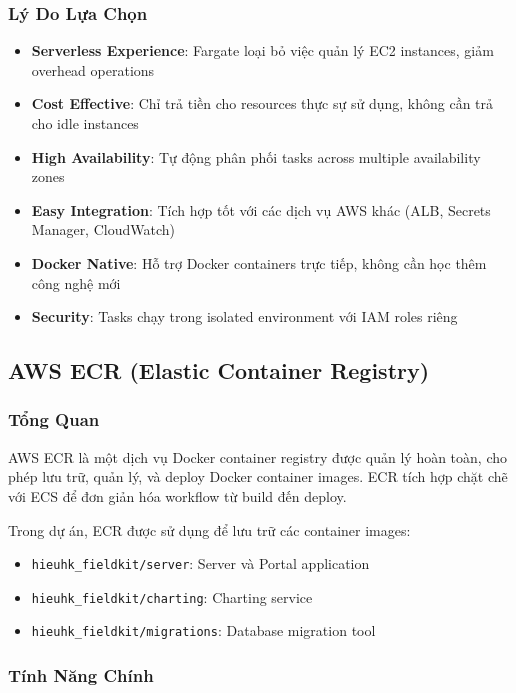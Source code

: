 \subsubsection{Lý Do Lựa Chọn}

\begin{itemize}
    \item \textbf{Serverless Experience}: Fargate loại bỏ việc quản lý EC2 instances, giảm overhead operations
    \item \textbf{Cost Effective}: Chỉ trả tiền cho resources thực sự sử dụng, không cần trả cho idle instances
    \item \textbf{High Availability}: Tự động phân phối tasks across multiple availability zones
    \item \textbf{Easy Integration}: Tích hợp tốt với các dịch vụ AWS khác (ALB, Secrets Manager, CloudWatch)
    \item \textbf{Docker Native}: Hỗ trợ Docker containers trực tiếp, không cần học thêm công nghệ mới
    \item \textbf{Security}: Tasks chạy trong isolated environment với IAM roles riêng
\end{itemize}

\subsection{AWS ECR (Elastic Container Registry)}

\subsubsection{Tổng Quan}

AWS ECR là một dịch vụ Docker container registry được quản lý hoàn toàn, cho phép lưu trữ, quản lý, và deploy Docker container images. ECR tích hợp chặt chẽ với ECS để đơn giản hóa workflow từ build đến deploy.

Trong dự án, ECR được sử dụng để lưu trữ các container images:
\begin{itemize}
    \item \texttt{hieuhk\_fieldkit/server}: Server và Portal application
    \item \texttt{hieuhk\_fieldkit/charting}: Charting service
    \item \texttt{hieuhk\_fieldkit/migrations}: Database migration tool
\end{itemize}

\subsubsection{Tính Năng Chính}

